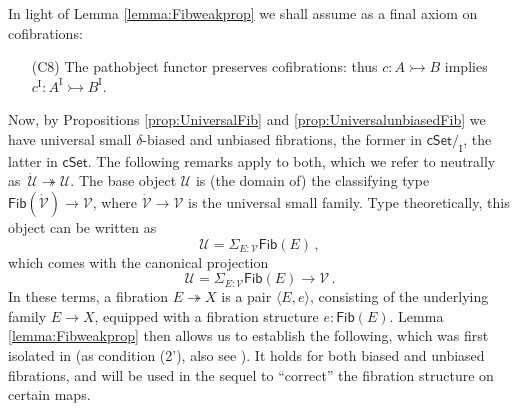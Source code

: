 \documentclass[11pt]{amsart}
\newcommand{\cSet}{\ensuremath{\mathsf{cSet}}}
\newcommand{\cof}{\ensuremath{\rightarrowtail}}
\newcommand{\fib}{\ensuremath{\twoheadrightarrow}}
\renewcommand{\to}{\ensuremath{\rightarrow}}
\newcommand{\too}{\ensuremath{\longrightarrow}}
\newcommand{\I}{\ensuremath{\mathrm{I}}}
\newcommand{\U}{\ensuremath{\mathcal{U}}}
\newcommand{\UU}{\ensuremath{\,\dot{\mathcal{U}}}}
\newcommand{\V}{\ensuremath{\mathcal{V}}}
\newcommand{\VV}{\ensuremath{\dot{\mathcal{V}}}}
\newcommand{\Fib}{\ensuremath{\mathsf{Fib}}}
\theoremstyle{remark}
\theoremstyle{definition}
\begin{document}
In light of Lemma \ref{lemma:Fibweakprop} we shall assume as a final axiom on cofibrations:
 
\begin{enumerate}
\item[(C8)] The pathobject functor preserves cofibrations: thus $c:A \cof B$ implies $c^\I:A^\I \cof B^\I$.
\end{enumerate}

Now, by Propositions \ref{prop:UniversalFib} and \ref{prop:UniversalunbiasedFib} we have universal small $\delta$-biased and unbiased fibrations, the former in $\cSet/_\I$, the latter in $\cSet$.  The following remarks apply to both, which we refer to neutrally as $\UU \fib \U$.  The base object $\U$ is (the domain of) the classifying type $\mathsf{Fib}(\VV) \to \V$, where $\VV \to \V$ is the universal small family.  Type theoretically, this object can be written as
\[
\U = \Sigma_{E:\V}\Fib(E)\,,
\] 
which comes with the canonical projection
\[
\U = \Sigma_{E:\V}\Fib(E) \too \V\,.
\] 
In these terms, a fibration $E \fib X$ is a pair $\langle E, e \rangle$, consisting of the underlying family $E\to X$, equipped with a fibration structure $e :\Fib(E)$.
%
\noindent Lemma \ref{lemma:Fibweakprop}  then allows us to establish the following, which was first isolated in \cite{Shu:UAERP}  (as condition (2'), also see \cite{Shu:15}). It holds for both biased and unbiased fibrations, and will be used in the sequel to ``correct'' the fibration structure on certain maps.
\end{document}
